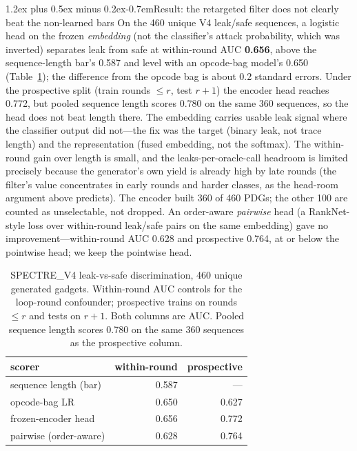 \documentclass[conference]{IEEEtran}
\makeatletter
\renewcommand\paragraph{\@startsection{paragraph}{4}{\z@}%
  {1.2ex plus 0.5ex minus 0.2ex}{-0.7em}{\normalfont\normalsize\bfseries}}
\makeatother
\begin{document}
\paragraph{Result: the retargeted filter does not clearly beat the non-learned bars}
On the 460 unique V4 leak/safe sequences, a logistic head on the frozen
\emph{embedding} (not the classifier's attack probability, which was inverted)
separates leak from safe at within-round AUC \textbf{0.656}, above the
sequence-length bar's 0.587 and level with an opcode-bag model's 0.650
(Table~\ref{tab:v4filter}); the difference from the opcode bag is about 0.2
standard errors. Under the prospective split (train rounds $\le r$,
test $r{+}1$) the encoder head reaches 0.772, but pooled sequence length
scores 0.780 on the same 360 sequences, so the head does not beat length
there. The embedding carries usable leak signal where the
classifier output did not---the fix was the target (binary leak, not trace
length) and the representation (fused embedding, not the softmax). The
within-round gain over length is small, and the leaks-per-oracle-call headroom is
limited precisely because the generator's own yield is already high by late
rounds (the filter's value concentrates in early rounds and harder classes,
as the head-room argument above predicts). The encoder built 360 of 460 PDGs;
the other 100 are counted as unselectable, not dropped. An order-aware
\emph{pairwise} head (a RankNet-style loss over within-round leak/safe pairs on
the same embedding) gave no improvement---within-round AUC 0.628 and prospective
0.764, at or below the pointwise head; we keep the
pointwise head.

\begin{table}[t]
\centering
\caption{SPECTRE\_V4 leak-vs-safe discrimination, 460 unique generated
  gadgets. Within-round AUC controls for the loop-round confounder; prospective
  trains on rounds $\le r$ and tests on $r{+}1$. Both columns are AUC. Pooled
  sequence length scores 0.780 on the same 360 sequences as the prospective
  column.}
\label{tab:v4filter}
\footnotesize
\begin{tabular}{@{}lrr@{}}
\toprule
scorer & within-round & prospective \\
\midrule
sequence length (bar) & 0.587 & --- \\
opcode-bag LR         & 0.650 & 0.627 \\
frozen-encoder head   & 0.656 & 0.772 \\
\quad pairwise (order-aware) & 0.628 & 0.764 \\
\bottomrule
\end{tabular}
\end{table}
\end{document}
